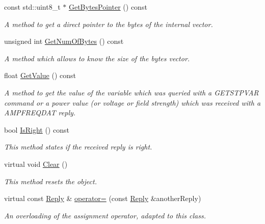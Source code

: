 \begin{DoxyCompactItemize}
\mbox{\label{classReply_a69d6dc14661b2a2148d16a1345cebc32}} 
const std\+::uint8\+\_\+t $\ast$ \hyperlink{classReply_a69d6dc14661b2a2148d16a1345cebc32}{Get\+Bytes\+Pointer} () const
\begin{DoxyCompactList}\small\item\em A method to get a direct pointer to the bytes of the internal vector. \end{DoxyCompactList}\item 
\mbox{\label{classReply_a8aada6cea6e2008c6ba824fc7035627f}} 
unsigned int \hyperlink{classReply_a8aada6cea6e2008c6ba824fc7035627f}{Get\+Num\+Of\+Bytes} () const
\begin{DoxyCompactList}\small\item\em A method which allows to know the size of the bytes vector. \end{DoxyCompactList}\item 
\mbox{\label{classReply_a4d9caba2f778fc50ea55e937f01e16db}} 
float \hyperlink{classReply_a4d9caba2f778fc50ea55e937f01e16db}{Get\+Value} () const
\begin{DoxyCompactList}\small\item\em A method to get the value of the variable which was queried with a {\itshape G\+E\+T\+S\+T\+P\+V\+AR} command or a power value (or voltage or field strength) which was received with a {\itshape A\+M\+P\+F\+R\+E\+Q\+D\+AT} reply. \end{DoxyCompactList}\item 
bool \hyperlink{classReply_a8527429859aeab3a0e62081871e5ce92}{Is\+Right} () const
\begin{DoxyCompactList}\small\item\em This method states if the received reply is right. \end{DoxyCompactList}\item 
\mbox{\label{classReply_a387ea6ba4bad8ad832c2e5f4a95878d6}} 
virtual void \hyperlink{classReply_a387ea6ba4bad8ad832c2e5f4a95878d6}{Clear} ()
\begin{DoxyCompactList}\small\item\em This method resets the object. \end{DoxyCompactList}\item 
virtual const \hyperlink{classReply}{Reply} \& \hyperlink{classReply_a7a4a6c76ee53d9ecf9833ab2880c3420}{operator=} (const \hyperlink{classReply}{Reply} \&another\+Reply)
\begin{DoxyCompactList}\small\item\em An overloading of the assignment operator, adapted to this class. \end{DoxyCompactList}\end{DoxyCompactItemize}
